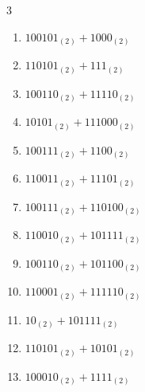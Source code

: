 \begin{multicols}{3}
\begin{enumerate}

  \item $100101_{(2)} + 1000_{(2)}$


  \item $110101_{(2)} + 111_{(2)}$


  \item $100110_{(2)} + 11110_{(2)}$


  \item $10101_{(2)} + 111000_{(2)}$


  \item $100111_{(2)} + 1100_{(2)}$


  \item $110011_{(2)} + 11101_{(2)}$


  \item $100111_{(2)} + 110100_{(2)}$


  \item $110010_{(2)} + 101111_{(2)}$


\columnbreak %

  \item $100110_{(2)} + 101100_{(2)}$


  \item $110001_{(2)} + 111110_{(2)}$


  \item $10_{(2)} + 101111_{(2)}$


  \item $110101_{(2)} + 10101_{(2)}$


  \item $100010_{(2)} + 1111_{(2)}$



\end{enumerate}
\end{multicols}

